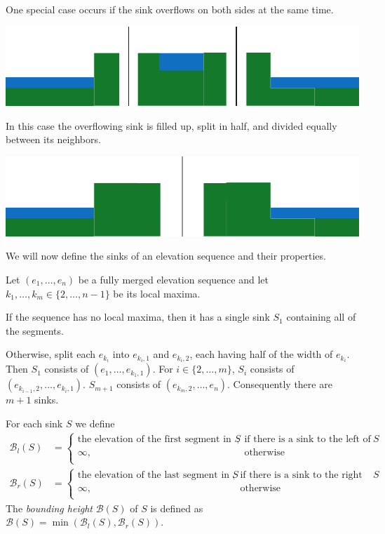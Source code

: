 \documentclass[11pt,a4paper]{article}
\newcommand{\Br}{\mathcal{B}_r}
\newcommand{\Bl}{\mathcal{B}_l}
\newcommand{\B}{\mathcal{B}}
\begin{document}
One special case occurs if the sink overflows on both sides at the same time.
\begin{center}
  \includegraphics{im13.pdf}
\end{center}
In this case the overflowing sink is filled up, split in half, and divided equally between its neighbors.
\begin{center}
  \includegraphics{im14.pdf}
\end{center}

We will now define the sinks of an elevation sequence and their properties.

Let $(e_1,\ldots,e_n)$ be a fully merged elevation sequence and let $k_1,\ldots,k_m \in \{2,\ldots,n-1\}$ be its local maxima.

If the sequence has no local maxima, then it has a single sink $S_1$ containing all of the segments.

Otherwise, split each $e_{k_i}$ into $e_{k_i,1}$ and $e_{k_i,2}$, each having half of the width of $e_{k_i}$.
Then $S_1$ consists of $(e_1,\ldots,e_{k_1,1})$.
For $i\in\{2,\ldots,m\}$, $S_i$ consists of $(e_{k_{i-1},2},\ldots,e_{k_i,1})$.
$S_{m+1}$ consists of $(e_{k_m,2},\ldots,e_n)$.
Consequently there are $m+1$ sinks.

For each sink $S$ we define
\begin{align*}
    \Bl(S) &=
        \begin{cases}
            \textrm{the elevation of the first segment in $S$}, & \textrm{if there is a sink to the left of $S$} \\
            \infty, & \textrm{otherwise} \\
        \end{cases} \\
    \Br(S) &=
        \begin{cases}
            \textrm{the elevation of the last segment in $S$}, & \textrm{if there is a sink to the right of $S$} \\
            \infty, & \textrm{otherwise} \\
        \end{cases}
\end{align*}
The \textit{bounding height} $\B(S)$ of $S$ is defined as $\B(S) = \min(\Bl(S), \Br(S))$.
\end{document}
